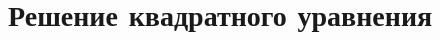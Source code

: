 \documentclass{article}
\title{}
\author{}
\date{}
\begin{document}
\maketitle

\section{Решение квадратного уравнения}
\end{document}
